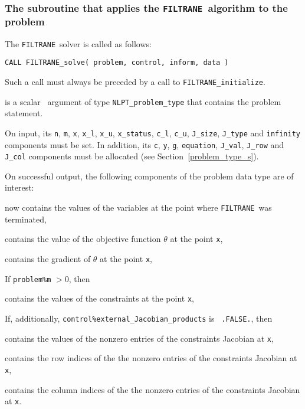 \documentclass{galahad}
\newcommand{\packagename}{FILTRANE}
\newcommand{\filtrane}{{\tt \packagename}}
\begin{document}

\subsubsection{The subroutine that applies the \filtrane\ algorithm to the
problem}
The \filtrane\ solver is called as follows:
\vspace*{1mm}

\hspace{8mm}
{\tt CALL \packagename\_solve( problem, control, inform, data )}

\noindent
Such a call must always be preceded by a call to {\tt \packagename\_initialize}.

\begin{description}
 is a scalar \intentout\ argument of type 
{\tt NLPT\_problem\_type} that contains the problem statement. 

\noindent
On input, its
{\tt n}, {\tt m}, {\tt x}, {\tt x\_l}, {\tt x\_u}, {\tt x\_status}, {\tt c\_l},
{\tt c\_u}, {\tt J\_size}, {\tt J\_type} and {\tt infinity} components must be
set. In addition, its {\tt c}, {\tt y}, {\tt g}, {\tt equation}, {\tt J\_val},
{\tt J\_row} and {\tt J\_col} components must be allocated (see 
Section~\ref{problem_type_s}).

\noindent
On successful output, the following components of the problem data type are of
interest:
\begin{description}
 now contains the values of the variables at the point where
\filtrane\ was terminated,


 contains the value of the objective function $\theta$ at the point
{\tt x},

 contains the gradient of $\theta$ at the point {\tt x},
\end{description}
If {\tt problem\%m} $>0$, then
\begin{description}
 contains the values of the constraints at the point {\tt x},
\end{description}
If, additionally, {\tt control\%external\_Jacobian\_products} is {\tt
.FALSE.},
then
\begin{description}
 contains the values of the nonzero entries of the constraints
Jacobian at {\tt x},

 contains the row indices of the the nonzero entries of the
constraints Jacobian at {\tt x},

 contains the column indices of the the nonzero entries of the
constraints Jacobian at {\tt x}.
\end{description}
 

\end{description}
\end{document}
